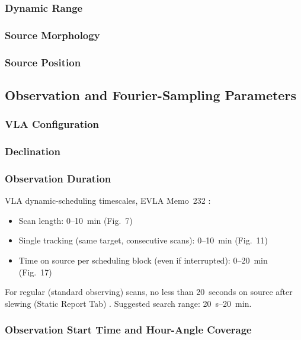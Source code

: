 \documentclass[11pt]{article}
\begin{document}
\subsubsection{Dynamic Range}

\subsubsection{Source Morphology}

\subsubsection{Source Position}

\subsection{Observation and Fourier-Sampling Parameters}

\subsubsection{VLA Configuration}

\subsubsection{Declination}

\subsubsection{Observation Duration}

VLA dynamic-scheduling timescales, EVLA Memo~232 \cite{faes2024evla232}:
\begin{itemize}
    \item Scan length: 0--10~min (Fig.~7)
    \item Single tracking (same target, consecutive scans): 0--10~min (Fig.~11)
    \item Time on source per scheduling block (even if interrupted): 0--20~min (Fig.~17)
\end{itemize}

For regular (standard observing) scans, no less than 20~seconds on source after slewing (Static Report Tab) \cite{nrao-vla-obsguide}.
Suggested search range: 20~s--20~min.

\subsubsection{Observation Start Time and Hour-Angle Coverage}
\end{document}
